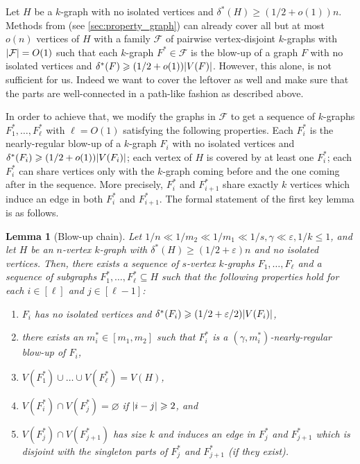\documentclass[12pt,reqno]{amsart}
\theoremstyle{plain}
\newtheorem{lemma}[theorem]{Lemma}
\theoremstyle{definition}
\numberwithin{equation}{section}
\DeclarePairedDelimiter{\abs}{\lvert}{\rvert}
\renewcommand{\ge}{\geqslant}
\renewcommand{\geq}{\geqslant}
\renewcommand{\leq}{\leqslant}
\renewcommand{\emptyset}{\varnothing}
\newcommand{\eps}{\varepsilon}
\newcommand{\comin}{\delta^{\ast}}
\newcommand{\cF}{\mathcal{F}}
\begin{document}
	Let $H$ be a $k$-graph with no isolated vertices and $\comin(H) \ge (1/2+o(1))n$.
	Methods from \cite{lang2023tiling} (see \cref{sec:property_graph}) can already cover all but at most $o(n)$ vertices of $H$ with a family $\cF$ of pairwise vertex-disjoint $k$-graphs with $\abs{\cF}=O(1)$ such that each $k$-graph $F^\ast \in \cF$ is the blow-up of a graph $F$ with no isolated vertices and $\comin(F) \ge (1/2+o(1))\abs{V(F)}$.
	However, this alone, is not sufficient for us.
	Indeed we want to cover the leftover as well and make sure that the parts are well-connected in a path-like fashion as described above.
	
	In order to achieve that, we modify the graphs in $\cF$ to get a sequence of $k$-graphs $F_1^\ast, \dotsc, F_{\ell}^\ast$ with $\ell=O(1)$ satisfying the following properties.
	Each $F_i^\ast$ is the nearly-regular blow-up of a $k$-graph $F_i$ with no isolated vertices and $\comin(F_i) \ge (1/2+o(1))\abs{V(F_i)}$; each vertex of $H$ is covered by at least one $F_i^\ast$; each $F_i^\ast$ can share vertices only with the $k$-graph coming before and the one coming after in the sequence.
	More precisely, $F_i^\ast$ and $F_{i+1}^\ast$ share exactly $k$ vertices which induce an edge in both $F_i^\ast$ and $F_{i+1}^\ast$.
	The formal statement of the first key lemma is as follows.
	\begin{lemma}[Blow-up chain]\label{lem:findblowupchain}
		Let $1/n\ll 1/m_2\ll 1/m_1 \ll 1/s, \gamma \ll \eps, 1/k\leq 1$, and let $H$ be an $n$-vertex $k$-graph with $\comin(H) \ge (1/2+\eps)n$ and no isolated vertices. Then, there exists a sequence of $s$-vertex $k$-graphs $F_1,\dotsc, F_\ell$ and a sequence of subgraphs $F_1^\ast,\dotsc, F_\ell^\ast\subseteq H$ such that the following properties hold for each $i \in [\ell]$ and $j \in [\ell-1]$:
		\begin{enumerate}[label = \textup{(}\arabic*\textup{)}]
			\item \label{blowup_1} $F_i$ has no isolated vertices and $\comin(F_i) \ge (1/2+\eps/2)\abs{V(F_i)}$,
			\item \label{blowup_2} there exists an $m_i^\ast\in [m_1,m_2]$ such that $F_i^\ast$ is a $(\gamma, m_i^\ast)$-nearly-regular blow-up of $F_i$,
			\item \label{blowup_3} $V(F_1^\ast) \cup \dots \cup V(F_\ell^\ast)=V(H)$,
			\item \label{blowup_4} $V(F_i^\ast)\cap V(F_j^\ast)=\emptyset$ if $\abs{i - j}\geq 2$, and
			\item \label{blowup_5} $V(F_j^\ast)\cap V(F_{j+1}^\ast)$ has size $k$ and induces an edge in $F_j^\ast$ and $F_{j+1}^\ast$ which is disjoint with the singleton parts of $F_j^\ast$ and $F_{j+1}^\ast$ \textup{(}if they exist\textup{)}.
		\end{enumerate}
	\end{lemma}
	
\end{document}
